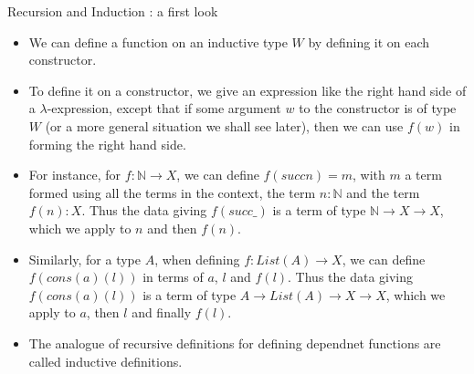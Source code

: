 \documentclass[10 pt., handout]{beamer}
\theoremstyle{plain}
\theoremstyle{remark}
\newcommand{\N}{\mathbb{N}}
\begin{document}
\begin{frame}{Recursion and Induction : a first look}

\begin{itemize}

\item We can define a function on an inductive type $W$ by defining it on each constructor.

\item To define it on a constructor, we give an expression like the right hand side of a $\lambda$-expression, except that if some argument $w$ to the constructor is of type $W$ (or a more general situation we shall see later), then we can use $f(w)$ in forming the right hand side.

\item For instance, for $f: \N \to X$, we can define $f(succ n) = m$, with $m$ a term formed using all the terms in the context, the term $n : \N$ and the term $f(n) : X$. Thus the data giving $f(succ \_)$ is a term of type $\N \to X \to X$, which we apply to $n$ and then $f(n)$.

\item Similarly, for a type $A$, when defining $f : List(A) \to X$, we can define $f(cons(a)(l))$ in terms of $a$, $l$ and $f(l)$. Thus the data giving $f(cons(a)(l))$ is a term of type $A \to List(A) \to X \to X$, which we apply to $a$, then $l$ and finally $f(l)$. 

\item The analogue of recursive definitions for defining dependnet functions are called inductive definitions.

\end{itemize}

\end{frame}
\end{document}
